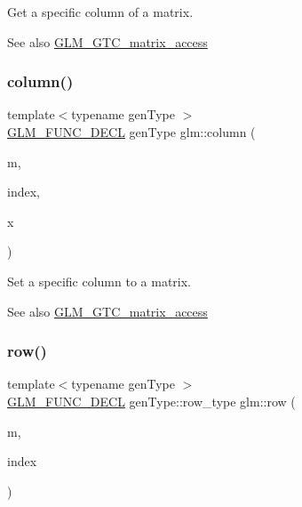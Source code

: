 Get a specific column of a matrix. \begin{DoxySeeAlso}{See also}
\mbox{\hyperlink{group__gtc__matrix__access}{G\+L\+M\+\_\+\+G\+T\+C\+\_\+matrix\+\_\+access}} 
\end{DoxySeeAlso}
\mbox{\label{group__gtc__matrix__access_ga9e757377523890e8b80c5843dbe4dd15}} 
\subsubsection{\texorpdfstring{column()}{column()}\hspace{0.1cm}{\footnotesize\ttfamily [2/2]}}
{\footnotesize\ttfamily template$<$typename gen\+Type $>$ \\
\mbox{\hyperlink{setup_8hpp_ab2d052de21a70539923e9bcbf6e83a51}{G\+L\+M\+\_\+\+F\+U\+N\+C\+\_\+\+D\+E\+CL}} gen\+Type glm\+::column (\begin{DoxyParamCaption}\item[{gen\+Type const \&}]{m,  }\item[{\mbox{\hyperlink{namespaceglm_a090a0de2260835bee80e71a702492ed9}{length\+\_\+t}}}]{index,  }\item[{typename gen\+Type\+::col\+\_\+type const \&}]{x }\end{DoxyParamCaption})}

Set a specific column to a matrix. \begin{DoxySeeAlso}{See also}
\mbox{\hyperlink{group__gtc__matrix__access}{G\+L\+M\+\_\+\+G\+T\+C\+\_\+matrix\+\_\+access}} 
\end{DoxySeeAlso}
\mbox{\label{group__gtc__matrix__access_ga259e5ebd0f31ec3f83440f8cae7f5dba}} 
\subsubsection{\texorpdfstring{row()}{row()}\hspace{0.1cm}{\footnotesize\ttfamily [1/2]}}
{\footnotesize\ttfamily template$<$typename gen\+Type $>$ \\
\mbox{\hyperlink{setup_8hpp_ab2d052de21a70539923e9bcbf6e83a51}{G\+L\+M\+\_\+\+F\+U\+N\+C\+\_\+\+D\+E\+CL}} gen\+Type\+::row\+\_\+type glm\+::row (\begin{DoxyParamCaption}\item[{gen\+Type const \&}]{m,  }\item[{\mbox{\hyperlink{namespaceglm_a090a0de2260835bee80e71a702492ed9}{length\+\_\+t}}}]{index }\end{DoxyParamCaption})}

